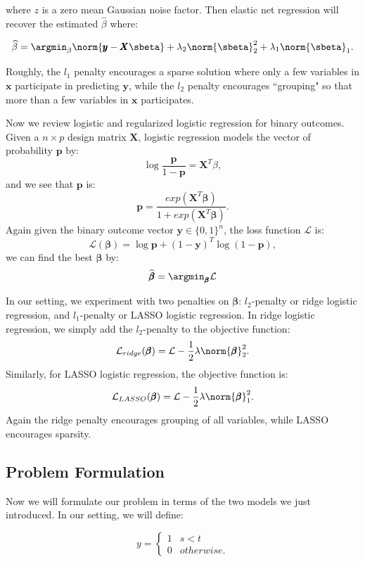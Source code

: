 where $z$ is a zero mean Gaussian noise factor. Then elastic net regression will recover the estimated $\widehat{\mathcal{\beta}}$ where:

	\[
		\widehat{\mathcal{\beta}} = \argmin_{\beta} \norm{\pmb{y} - \pmb{X} \sbeta} + \lambda_2 \norm{\sbeta}_2^2 + \lambda_1 \norm{\sbeta}_1.
	\]

Roughly, the $l_1$ penalty encourages a sparse solution where only a few variables in $\pmb{x}$ participate in predicting $\pmb{y}$, while the $l_2$ penalty encourages ``grouping" so that more than a few variables in $\pmb{x}$ participates. 

Now we review logistic and regularized logistic regression for binary outcomes. Given a $n \times p$ design matrix $\pmb{X}$, logistic regression models the vector of probability $\pmb{p}$ by:
	\[
		\log \frac{\pmb{p}}{1 - \pmb{p}} = \pmb{X}^T \mathcal{\beta},
	\]
and we see that $\pmb{p}$ is:
	\[
		\pmb{p} = \frac{exp(\pmb{X}^T \pmb{\beta})}{1 + exp(\pmb{X}^T \pmb{\beta})}.
	\]
Again given the binary outcome vector $\pmb{y} \in \{0,1\}^n$, the loss function $\mathcal{L}$ is:
	\[
		\mathcal{L}(\pmb{\beta}) = \log \pmb{p} + (1-\pmb{y})^T \log(1 - \pmb{p}),
	\]
we can find the best $\pmb{\beta}$ by:
	\[	
		\widehat{\pmb{\beta}} = \argmin_{\pmb{\beta}} \mathcal{L}
	\]

In our setting, we experiment with two penalties on $\pmb{\beta}$: $l_2$-penalty or ridge logistic regression, and $l_1$-penalty or LASSO logistic regression. In ridge logistic regression, we simply add the $l_2$-penalty to the objective function:
	\[	
		\mathcal{L}_{ridge}(\pmb{\beta}) = \mathcal{L} - \frac{1}{2} \lambda \norm{\pmb{\beta}}_2^2.
	\]
Similarly, for LASSO logistic regression, the objective function is:
	\[	
		\mathcal{L}_{LASSO}(\pmb{\beta}) = \mathcal{L} - \frac{1}{2} \lambda \norm{\pmb{\beta}}_1^2.
	\]
Again the ridge penalty encourages grouping of all variables, while LASSO encourages sparsity.

\subsection{Problem Formulation}

Now we will formulate our problem in terms of the two models we just introduced. In our setting, we will define:

\[   
y = \left\{
\begin{array}{ll}
      1 & s < t \\
      0 & otherwise.
\end{array} 
\right. 
\]

